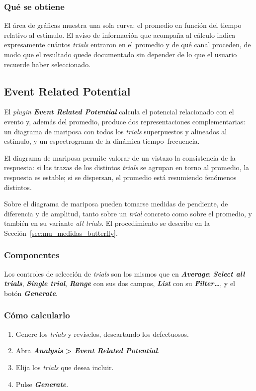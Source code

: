 \documentclass[11pt,a4paper]{article}
\begin{document}
    \subsubsection*{Qu\'e se obtiene}
    El \'area de gr\'aficas muestra una sola curva: el promedio en funci\'on del tiempo relativo al est\'imulo. El aviso de informaci\'on que acompa\~na al c\'alculo indica expresamente cu\'antos \textit{trials} entraron en el promedio y de qu\'e canal proceden, de modo que el resultado quede documentado sin depender de lo que el usuario recuerde haber seleccionado.

    \subsection{Event Related Potential}
    El \textit{plugin} \textbf{\textit{Event Related Potential}} calcula el potencial relacionado con el evento y, adem\'as del promedio, produce dos representaciones complementarias: un diagrama de mariposa con todos los \textit{trials} superpuestos y alineados al est\'imulo, y un espectrograma de la din\'amica tiempo--frecuencia.

    El diagrama de mariposa permite valorar de un vistazo la consistencia de la respuesta: si las trazas de los distintos \textit{trials} se agrupan en torno al promedio, la respuesta es estable; si se dispersan, el promedio est\'a resumiendo fen\'omenos distintos.

    Sobre el diagrama de mariposa pueden tomarse medidas de pendiente, de diferencia y de amplitud, tanto sobre un \textit{trial} concreto como sobre el promedio, y tambi\'en en su variante \textit{all trials}. El procedimiento se describe en la Secci\'on~\ref{sec:mu_medidas_butterfly}.

    \subsubsection*{Componentes}
    Los controles de selecci\'on de \textit{trials} son los mismos que en \textbf{\textit{Average}}: \textbf{\textit{Select all trials}}, \textbf{\textit{Single trial}}, \textbf{\textit{Range}} con sus dos campos, \textbf{\textit{List}} con su \textbf{\textit{Filter\ldots}}, y el bot\'on \textbf{\textit{Generate}}.

    \subsubsection*{C\'omo calcularlo}
    \begin{enumerate}
        \item Genere los \textit{trials} y rev\'iselos, descartando los defectuosos.
        \item Abra \textbf{\textit{Analysis} > \textit{Event Related Potential}}.
        \item Elija los \textit{trials} que desea incluir.
        \item Pulse \textbf{\textit{Generate}}.
    \end{enumerate}
\end{document}
